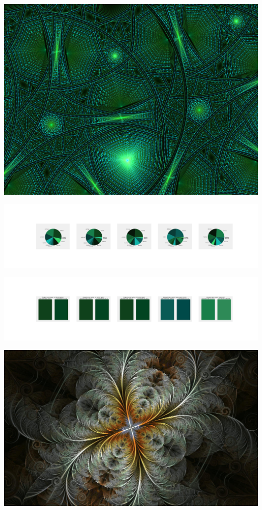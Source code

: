 \documentclass[11pt]{article}
\begin{document}
\begin{landscape}
    \begin{center}
    \includegraphics[width=\textwidth]{./nbimg/file (68).jpg}
    \end{center}

    \begin{center}
    \includegraphics[width=250mm]{./nbimg/pie-416.jpg}
    \end{center}

    \begin{center}
    \includegraphics[width=250mm]{./nbimg/peak-416.jpg}
    \end{center}
    

    \begin{center}
    \includegraphics[width=\textwidth]{./nbimg/file (69).jpg}
    \end{center}


\end{landscape}
\end{document}
